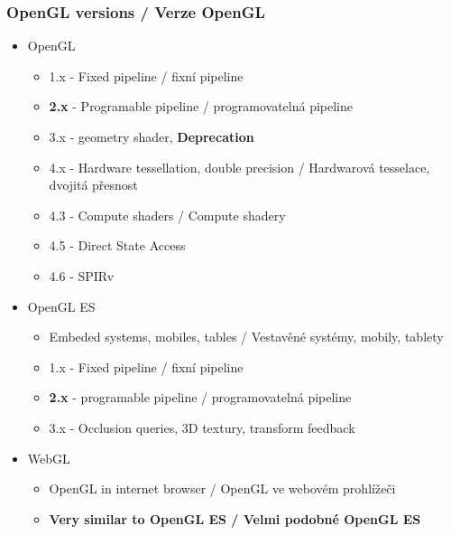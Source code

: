 \begin{frame}\frametitle{OpenGL versions / Verze OpenGL}\scriptsize
\begin{itemize}
\item{OpenGL}
\begin{itemize}\scriptsize
\item 1.x - Fixed pipeline / fixní pipeline
\item \textbf{2.x} - Programable pipeline / programovatelná pipeline
\item 3.x - geometry shader, \textbf{Deprecation}
\item 4.x - Hardware tessellation, double precision / Hardwarová tesselace, dvojitá přesnost
\item 4.3 - Compute shaders / Compute shadery
\item 4.5 - Direct State Access
\item 4.6 - SPIRv
\end{itemize}

\item{OpenGL ES}
\begin{itemize}\scriptsize
\item Embeded systems, mobiles, tables / Vestavěné systémy, mobily, tablety
\item 1.x - Fixed pipeline / fixní pipeline
\item \textbf{2.x} - programable pipeline / programovatelná pipeline
\item 3.x - Occlusion queries, 3D textury, transform feedback
\end{itemize}

\item{WebGL}
\begin{itemize}\scriptsize
\item OpenGL in internet browser / OpenGL ve webovém prohlížeči
\item \textbf{Very similar to OpenGL ES / Velmi podobné OpenGL ES}
\end{itemize}

\end{itemize}
\end{frame}

